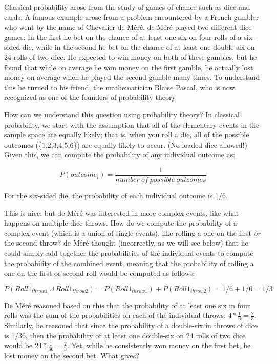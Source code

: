 \documentclass[]{book}
\theoremstyle{definition}
\theoremstyle{definition}
\theoremstyle{definition}
\theoremstyle{remark}
\begin{document}
Classical probability arose from the study of games of chance such as
dice and cards. A famous example arose from a problem encountered by a
French gambler who went by the name of Chevalier de Méré. de Méré played
two different dice games: In the first he bet on the chance of at least
one six on four rolls of a six-sided die, while in the second he bet on
the chance of at least one double-six on 24 rolls of two dice. He
expected to win money on both of these gambles, but he found that while
on average he won money on the first gamble, he actually lost money on
average when he played the second gamble many times. To understand this
he turned to his friend, the mathematician Blaise Pascal, who is now
recognized as one of the founders of probability theory.

How can we understand this question using probability theory? In
classical probability, we start with the assumption that all of the
elementary events in the sample space are equally likely; that is, when
you roll a die, all of the possible outcomes (\{1,2,3,4,5,6\}) are
equally likely to occur. (No loaded dice allowed!) Given this, we can
compute the probability of any individual outcome as:

\[
P(outcome_i) = \frac{1}{number\ of\ possible\ outcomes}
\]

For the six-sided die, the probability of each individual outcome is
1/6.

This is nice, but de Méré was interested in more complex events, like
what happens on multiple dice throws. How do we compute the probability
of a complex event (which is a union of single events), like rolling a
one on the first \emph{or} the second throw? de Méré thought
(incorrectly, as we will see below) that he could simply add together
the probabilities of the individual events to compute the probability of
the combined event, meaning that the probability of rolling a one on the
first or second roll would be computed as follows:

\[
P(Roll1_{throw1} \cup Roll1_{throw2}) = P(Roll1_{throw1}) + P(Roll1_{throw2}) = 1/6 + 1/6 = 1/3
\]

De Méré reasoned based on this that the probability of at least one six
in four rolls was the sum of the probabilities on each of the individual
throws: \(4*\frac{1}{6}=\frac{2}{3}\). Similarly, he reasoned that since
the probability of a double-six in throws of dice is 1/36, then the
probability of at least one double-six on 24 rolls of two dice would be
\(24*\frac{1}{36}=\frac{2}{3}\). Yet, while he consistently won money on
the first bet, he lost money on the second bet. What gives?
\end{document}
